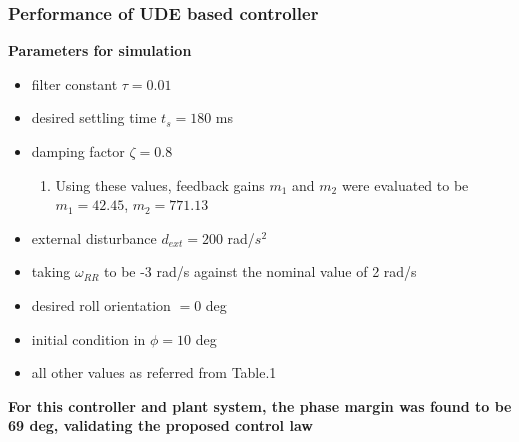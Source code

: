 \documentclass[table,10pt,red]{beamer}	%
\begin{document}

\begin{frame}
\frametitle{Performance of UDE based controller}
\textbf{Parameters for simulation}
\begin{itemize}  %
		\item filter constant $\tau=0.01$
		\item desired settling time $t_s= 180$ ms
		\item damping factor $\zeta = 0.8$
				\begin{enumerate}
					\item Using these values, feedback gains $m_1$ and $m_2$ were evaluated to be $m_1=42.45$, $m_2=771.13$ 
				\end{enumerate}
		\item external disturbance $d_{ext}= 200$ rad/$s^2$
		\item taking $\omega_{RR}$ to be -3 rad/s against the nominal value of 2 rad/s
		\item desired roll orientation $=0$ deg
		\item initial condition in $\phi= 10$ deg
		\item all other values as referred from Table.1
	\end{itemize}
	
\textbf{For this controller and plant system, the phase margin was found to be 69 deg, validating the proposed control law}
\end{frame}
\end{document}
